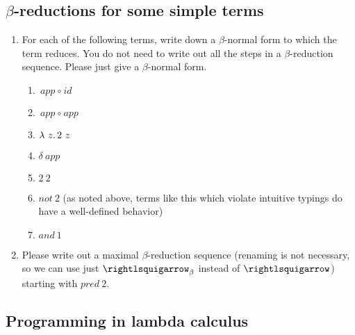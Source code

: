 \subsection{$\beta$-reductions for some simple terms}

\begin{enumerate}
\item For each of the following terms, write down a $\beta$-normal form to which the term reduces.  You do not need to write out all the steps in a $\beta$-reduction sequence.  Please just give a $\beta$-normal form.

  \begin{enumerate}
  \item $\textit{app}\ \circ\ \textit{id}$
\vspace{.5cm}
  \item $\textit{app}\ \circ\ \textit{app}$
\vspace{.5cm}
  \item $\lambda\ z.\, 2\ z$
\vspace{.5cm}
  \item $\delta\ \textit{app}$
\vspace{.5cm}
  \item $2\ 2$
\vspace{.5cm}
  \item $\textit{not}\ 2$ (as noted above, terms like this which violate intuitive typings do have a
    well-defined behavior)
\vspace{.5cm}
  \item $\textit{and}\ 1$
  \end{enumerate}

\item Please write out a maximal $\beta$-reduction sequence (renaming is not necessary, so we can use just $\betar$
  instead of $\betaa$) starting with $\textit{pred}\ 2$.

\end{enumerate}

\subsection{Programming in lambda calculus}

